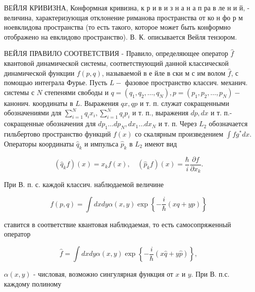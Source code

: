 \documentclass[10pt]{article}
\begin{document}
ВЕЙЛЯ КРИВИЗНА, Конформная кривизна, к р и в и з н а н а п ра в ле н и й, - величина, характеризующая отклонение риманова пространства от ко н фо р м ноевклидова пространства (то есть такого, которое может быть конформно отображено на евклидово пространство). В. К. описывается Вейля тензором.



ВЕЙЛЯ ПРАВИЛО СООТВЕТСТВИЯ - Правило, определяющее оператор $\hat{f}$ квантовой динамической системы, соответствующий данной классической динамической функции $f(p, q)$, называемой в е йле в ски м с им волом $\hat{f}$, с помощью интеграла Фурье. Пусть $L-$ фазовое пространство классич. механич. системы с $N$ степенями свободы и $q=\left(q_{1}, q_{2}, \ldots, q_{N}\right), p=\left(p_{1}, p_{2}, \ldots, p_{N}\right)-$ канонич. координаты в $L$. Выражения $q x, q p$ и т. п. служат сокращенными обозначениями для $\sum_{i=1}^{N} q_{i} x_{i}, \sum_{i=1}^{N} q_{i} p_{i}$ и т. п., выражения $d p, d x$ и т. п.- сокращенные обозначения для $d p_{1} \ldots d p_{N}, d x_{1} \ldots d x_{N}$ и т. п. Через $L_{2}$ обозначается гильбертово пространство функций $f(x)$ со скалярным произведением $\int f g^{*} d x$. Операторы координаты $\hat{q}_{k}$ и импульса $\hat{p}_{k}$ в $L_{2}$ имеют вид



\[

\left(\hat{q}_{k} f\right)(x)=x_{k} f(x), \quad\left(\hat{p}_{k} f\right)(x)=\frac{\hbar}{i} \frac{\partial f}{\partial x_{k}} .

\]



При В. п. с. каждой классич. наблюдаемой величине



\[

f(p, q)=\int d x d y \alpha(x, y) \exp \left\{-\frac{i}{\hbar}(x q+y p)\right\}

\]



ставится в соответствие квантовая наблюдаемая, то есть самосопряженный оператор



\[

\hat{f}=\int d x d y \alpha(x, y) \exp \left\{-\frac{i}{\hbar}(x \hat{q}+y \hat{p})\right\},

\]



$\alpha(x, y)$ - числовая, возможно сингулярная функция от $x$ и $y$. При В. п.с. каждому полиному
\end{document}

